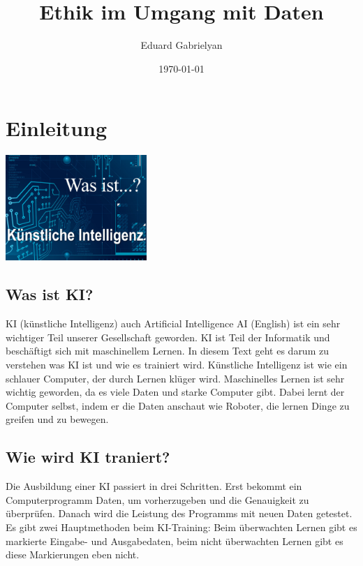 \documentclass{report}
\title{Ethik im Umgang mit Daten}
\author{Eduard Gabrielyan}
\date{\today}
\begin{document}
\maketitle


\tableofcontents

\chapter{Einleitung}

\includegraphics[width=0.4\textwidth]{KI.jpeg}

\section{Was ist KI?}
KI (künstliche Intelligenz) auch Artificial Intelligence AI (English) ist ein sehr wichtiger Teil unserer Gesellschaft geworden.
KI ist Teil der Informatik und beschäftigt sich mit maschinellem Lernen.
In diesem Text geht es darum zu verstehen was KI ist und wie es trainiert wird.
\newline
Künstliche Intelligenz ist wie ein schlauer Computer, der durch Lernen klüger wird. Maschinelles Lernen ist sehr wichtig geworden, da es viele Daten und starke Computer gibt. Dabei lernt der Computer selbst, indem er die Daten anschaut wie Roboter, die lernen Dinge zu greifen und zu bewegen.
\section{Wie wird KI traniert?}
Die Ausbildung einer KI passiert in drei Schritten. Erst bekommt ein Computerprogramm Daten, um vorherzugeben und die Genauigkeit zu überprüfen. Danach wird die Leistung des Programms mit neuen Daten getestet. Es gibt zwei Hauptmethoden beim KI-Training: Beim überwachten Lernen gibt es markierte Eingabe- und Ausgabedaten, beim nicht überwachten Lernen gibt es diese Markierungen eben nicht.
\end{document}
